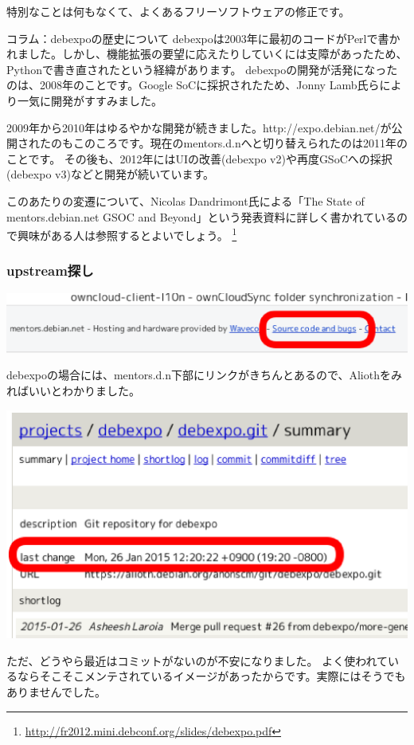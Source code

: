 \documentclass[mingoth,a4paper]{jsarticle}
\begin{document}
特別なことは何もなくて、よくあるフリーソフトウェアの修正です。

\begin{itembox}[l]{コラム：debexpoの歴史について}
debexpoは2003年に最初のコードがPerlで書かれました。しかし、機能拡張の要望に応えたりしていくには支障があったため、Pythonで書き直されたという経緯があります。
debexpoの開発が活発になったのは、2008年のことです。Google SoCに採択されたため、Jonny Lamb氏らにより一気に開発がすすみました。

2009年から2010年はゆるやかな開発が続きました。http://expo.debian.net/が公開されたのもこのころです。現在のmentors.d.nへと切り替えられたのは2011年のことです。
その後も、2012年にはUIの改善(debexpo v2)や再度GSoCへの採択(debexpo v3)などと開発が続いています。

このあたりの変遷について、Nicolas Dandrimont氏による「The State of mentors.debian.net GSOC and Beyond」という発表資料に詳しく書かれているので興味がある人は参照するとよいでしょう。
\footnote{\url{http://fr2012.mini.debconf.org/slides/debexpo.pdf}}
\end{itembox}

\subsubsection{upstream探し}

\begin{screen}
\includegraphics[width=0.5\hsize]{image201606/source-code-and-bugs.eps}
\end{screen}

debexpoの場合には、mentors.d.n下部にリンクがきちんとあるので、Aliothをみればいいとわかりました。

\begin{screen}
\includegraphics[width=0.5\hsize]{image201606/last-change-on-alioth.eps}
\end{screen}

ただ、どうやら最近はコミットがないのが不安になりました。
よく使われているならそこそこメンテされているイメージがあったからです。実際にはそうでもありませんでした。
\end{document}
